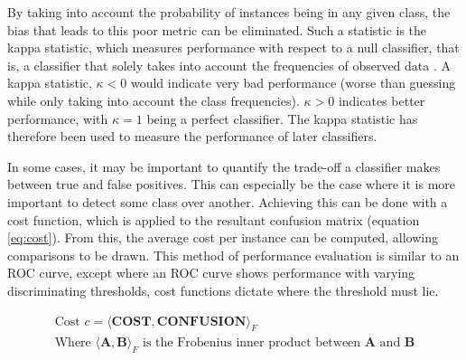 By taking into account the probability of instances being in any given class, the bias that leads to this poor metric can be eliminated. Such a statistic is the kappa statistic, which measures performance with respect to a null classifier, that is, a classifier that solely takes into account the frequencies of observed data \cite{viera2005understanding}. A kappa statistic, $\kappa < 0$  would indicate very bad performance (worse than guessing while only taking into account the class frequencies). $\kappa > 0$ indicates better performance, with $\kappa = 1$ being a perfect classifier. The kappa statistic has therefore been used to measure the performance of later classifiers.

In some cases, it may be important to quantify the trade-off a classifier makes between true and false positives. This can especially be the case where it is more important to detect some class over another. Achieving this can be done with a cost function, which is applied to the resultant confusion matrix (equation \ref{eq:cost}). From this, the average cost per instance can be computed, allowing comparisons to be drawn. This method of performance evaluation is similar to an ROC curve, except where an ROC curve shows performance with varying discriminating thresholds, cost functions dictate where the threshold must lie.

\begin{equation}
	\label{eq:cost}
	\begin{gathered}
		\text{Cost } c = \langle \mathbf{COST}, \mathbf{CONFUSION} \rangle_F \\
		\text{Where $\langle \mathbf{A}, \mathbf{B}\rangle_F$ is the Frobenius inner product between $\mathbf{A}$ and $\mathbf{B}$}
	\end{gathered}
\end{equation}

